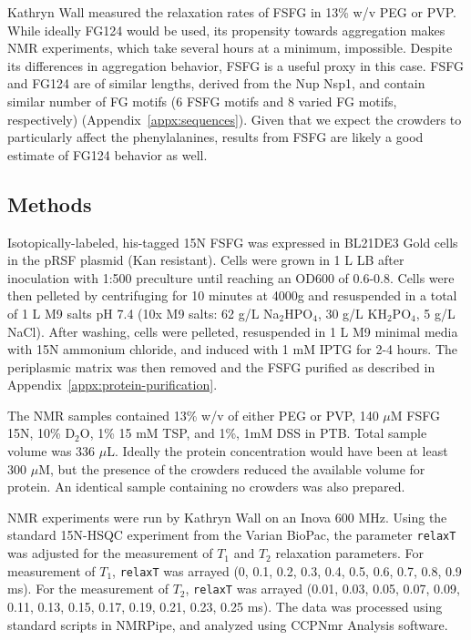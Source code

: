 Kathryn Wall measured the relaxation rates of FSFG in 13\% w/v PEG or PVP.  While ideally FG124 would be used, its propensity towards aggregation makes NMR experiments, which take several hours at a minimum, impossible.  Despite its differences in aggregation behavior, FSFG is a useful proxy in this case.  FSFG and FG124 are of similar lengths, derived from the Nup Nsp1, and contain similar number of FG motifs (6 FSFG motifs and 8 varied FG motifs, respectively) (Appendix~\ref{appx:sequences}).  Given that we expect the crowders to particularly affect the phenylalanines, results from FSFG are likely a good estimate of FG124 behavior as well.

\subsection{Methods}

Isotopically-labeled, his-tagged 15N FSFG was expressed in BL21DE3 Gold cells in the pRSF plasmid (Kan resistant).  Cells were grown in 1 L LB after inoculation with 1:500 preculture until reaching an OD600 of 0.6-0.8.  Cells were then pelleted by centrifuging for 10 minutes at 4000g and resuspended in a total of 1 L M9 salts pH 7.4 (10x M9 salts: 62 g/L Na$_2$HPO$_4$, 30 g/L KH$_2$PO$_4$, 5 g/L NaCl).  After washing, cells were pelleted, resuspended in 1 L M9 minimal media with 15N ammonium chloride, and induced with 1 mM IPTG for 2-4 hours.  The periplasmic matrix was then removed and the FSFG purified as described in Appendix~\ref{appx:protein-purification}.


The NMR samples contained 13\% w/v of either PEG or PVP, 140 $\mu$M FSFG 15N, 10\% D$_2$O, 1\% 15 mM TSP, and 1\%, 1mM DSS in PTB.  Total sample volume was 336 $\mu$L.  Ideally the protein concentration would have been at least 300 $\mu$M, but the presence of the crowders reduced the available volume for protein.  An identical sample containing no crowders was also prepared.

NMR experiments were run by Kathryn Wall on an Inova 600 MHz.  Using the standard 15N-HSQC experiment from the Varian BioPac, the parameter \texttt{relaxT} was adjusted for the measurement of $T_1$ and $T_2$ relaxation parameters.  For measurement of $T_1$, \texttt{relaxT} was arrayed (0, 0.1, 0.2, 0.3, 0.4, 0.5, 0.6, 0.7, 0.8, 0.9 ms).  For the measurement of $T_2$, \texttt{relaxT} was arrayed (0.01, 0.03, 0.05, 0.07, 0.09, 0.11, 0.13, 0.15, 0.17, 0.19, 0.21, 0.23, 0.25 ms).  The data was processed using standard scripts in NMRPipe, and analyzed using CCPNmr Analysis software.  


